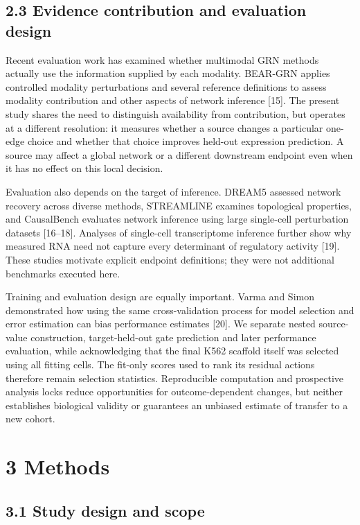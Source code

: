 \documentclass[
  11pt,
]{article}
\begin{document}
\subsection{2.3 Evidence contribution and evaluation
design}\label{evidence-contribution-and-evaluation-design}

Recent evaluation work has examined whether multimodal GRN methods
actually use the information supplied by each modality. BEAR-GRN applies
controlled modality perturbations and several reference definitions to
assess modality contribution and other aspects of network inference
{[}15{]}. The present study shares the need to distinguish availability
from contribution, but operates at a different resolution: it measures
whether a source changes a particular one-edge choice and whether that
choice improves held-out expression prediction. A source may affect a
global network or a different downstream endpoint even when it has no
effect on this local decision.

Evaluation also depends on the target of inference. DREAM5 assessed
network recovery across diverse methods, STREAMLINE examines topological
properties, and CausalBench evaluates network inference using large
single-cell perturbation datasets {[}16--18{]}. Analyses of single-cell
transcriptome inference further show why measured RNA need not capture
every determinant of regulatory activity {[}19{]}. These studies
motivate explicit endpoint definitions; they were not additional
benchmarks executed here.

Training and evaluation design are equally important. Varma and Simon
demonstrated how using the same cross-validation process for model
selection and error estimation can bias performance estimates {[}20{]}.
We separate nested source-value construction, target-held-out gate
prediction and later performance evaluation, while acknowledging that
the final K562 scaffold itself was selected using all fitting cells. The
fit-only scores used to rank its residual actions therefore remain
selection statistics. Reproducible computation and prospective analysis
locks reduce opportunities for outcome-dependent changes, but neither
establishes biological validity or guarantees an unbiased estimate of
transfer to a new cohort.

\section{3 Methods}\label{methods}

\subsection{3.1 Study design and scope}\label{study-design-and-scope}
\end{document}
